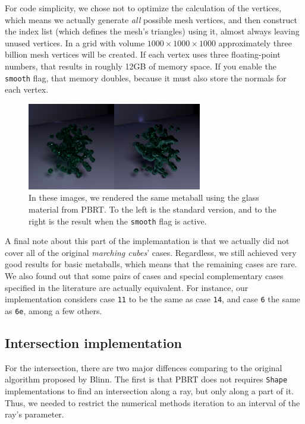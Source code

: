 \documentclass[conference]{acmsiggraph}
\begin{document}
For code simplicity, we chose not to optimize the calculation of the vertices, which 
means we actually generate \textit{all} possible mesh vertices, and then construct
the index list (which defines the mesh's triangles) using it, almost always
leaving unused vertices. In a grid with volume $1000 \times 1000 \times 1000$
approximately three billion mesh vertices will be created. If each vertex uses
three floating-point numbers, that results in roughly 12GB of memory space. If
you enable the \texttt{smooth} flag, that memory doubles, because it must also
store the normals for each vertex.

\begin{figure}[ht]
  \centering
  \includegraphics[width=3in]{images/glass-blob-comparison}
  \caption{In these images, we rendered the same metaball using the glass
           material from PBRT. To the left is the standard version, and to the
           right is the result when the \texttt{smooth} flag is active.}
  \label{img:glass-comp}
\end{figure}

A final note about this part of the implemantation is that we actually did not
cover all of the original \textit{marching cubes}' cases. Regardless, we still
achieved very good results for basic metaballs, which means that the remaining
cases are rare. We also found out that some pairs of cases and special
complementary cases specified in the literature are actually equivalent. For
instance, our implementation considers case \texttt{11} to be the same as case
\texttt{14}, and case \texttt{6} the same as \texttt{6e}, among a few others.

\subsection{Intersection implementation}

For the intersection, there are two major diffences comparing to the original
algorithm proposed by Blinn. The first is that PBRT does not requires
\texttt{Shape} implementations to find an intersection along a ray, but only
along a part of it. Thus, we needed to restrict the numerical methods iteration
to an interval of the ray's parameter.
\end{document}
